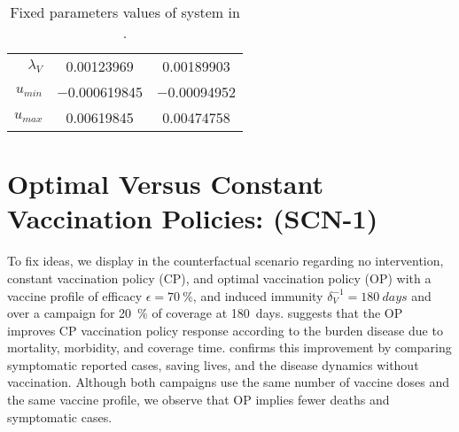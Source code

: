 \begin{table}[tbh]
\begin{center}
\begin{tabular}{rc@{}c}
            $\lambda_{V}$
                & \num{0.00123969}
                & \num{0.00189903}
            \\
                $u_{min}$
                & \num{-0.000619845}
                & \num{-0.00094952}
            \\
                $u_{max}$
                & \num{0.00619845}
                & \num{0.00474758}
            \\
            \bottomrule
        \end{tabular}
        \caption{%
            Fixed parameters values of system in
            .}
        \label{tbl:fixed_parameters-OCM}
    \end{center}
\end{table}
%
\section*{Optimal Versus Constant Vaccination Policies: (SCN-1)}
        To fix ideas, we display in
    the counterfactual scenario regarding no intervention, constant vaccination
    policy (CP), and optimal vaccination policy (OP) with a vaccine profile of
    efficacy $\epsilon = \SI{70}{\percent}$, and induced immunity
    $\delta_V^{-1} = \SI{180}{days}$ and over a campaign for \SI{20}{\percent}
    of coverage at \SI{180}{days}. 
    suggests that the OP improves CP vaccination policy response according to
    the burden disease due to mortality, morbidity, and coverage time.
     confirms this improvement by
    comparing symptomatic reported cases, saving lives, and the disease dynamics
    without vaccination. Although both campaigns use the same number of vaccine
    doses and the same vaccine profile, we observe that OP implies fewer deaths
    and symptomatic cases.

